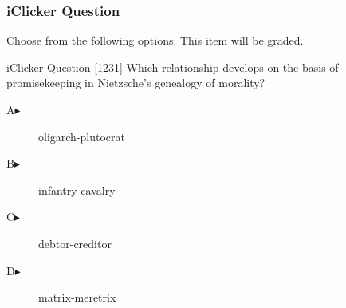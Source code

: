 \begin{frame}
  \frametitle{iClicker Question}
Choose from the following options. This item will be graded.
\begin{block}{iClicker Question}
[1231] Which relationship develops on the basis of promisekeeping in Nietzsche's genealogy of morality?
\end{block}
\begin{description}
\item[A\hspace{.2in}$\blacktriangleright$] oligarch-plutocrat
\item[B\hspace{.2in}$\blacktriangleright$] infantry-cavalry
\item[C\hspace{.2in}$\blacktriangleright$] debtor-creditor
\item[D\hspace{.2in}$\blacktriangleright$] matrix-meretrix
\end{description}
\end{frame}